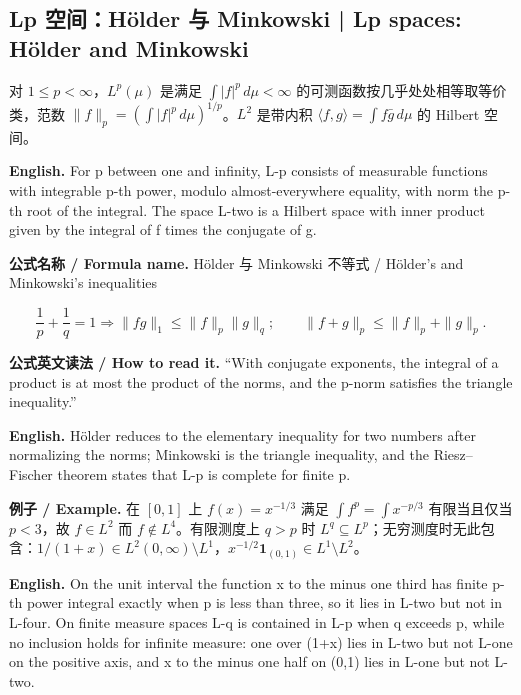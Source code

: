 \documentclass[UTF8,11pt,a4paper]{ctexart}
\newcommand{\EN}[1]{\par\noindent\textbf{English.} #1\par}
\newcommand{\READ}[1]{\par\noindent\textbf{公式英文读法 / How to read it.} #1\par}
\let\APSsubsection\subsection
\renewcommand{\subsection}[1]{\Needspace{6\baselineskip}\APSsubsection{#1}}
\newcommand{\FORMULA}[2]{\par\Needspace{3\baselineskip}\noindent\textbf{公式名称 / Formula name.} #1 / #2\par}
\newcommand{\EX}[2]{\par\noindent\textbf{例子 / Example.} #1\par\EN{#2}}
\begin{document}
\subsection{Lp 空间：Hölder 与 Minkowski | Lp spaces: Hölder and Minkowski}
\noindent 对 $1\le p<\infty$，$L^p(\mu)$ 是满足 $\int|f|^p\,d\mu<\infty$ 的可测函数按几乎处处相等取等价类，范数 $\|f\|_p=(\int|f|^p\,d\mu)^{1/p}$。$L^2$ 是带内积 $\langle f,g\rangle=\int f\bar g\,d\mu$ 的 Hilbert 空间。
\EN{For p between one and infinity, L-p consists of measurable functions with integrable p-th power, modulo almost-everywhere equality, with norm the p-th root of the integral. The space L-two is a Hilbert space with inner product given by the integral of f times the conjugate of g.}
\FORMULA{Hölder 与 Minkowski 不等式}{Hölder's and Minkowski's inequalities}
\[
\frac1p+\frac1q=1\Rightarrow\|fg\|_1\le\|f\|_p\|g\|_q;
\qquad
\|f+g\|_p\le\|f\|_p+\|g\|_p.
\]
\READ{“With conjugate exponents, the integral of a product is at most the product of the norms, and the p-norm satisfies the triangle inequality.”}
\EN{Hölder reduces to the elementary inequality for two numbers after normalizing the norms; Minkowski is the triangle inequality, and the Riesz--Fischer theorem states that L-p is complete for finite p.}
\EX{在 $[0,1]$ 上 $f(x)=x^{-1/3}$ 满足 $\int f^p=\int x^{-p/3}$ 有限当且仅当 $p<3$，故 $f\in L^2$ 而 $f\notin L^4$。有限测度上 $q>p$ 时 $L^q\subseteq L^p$；无穷测度时无此包含：$1/(1+x)\in L^2(0,\infty)\setminus L^1$，$x^{-1/2}\mathbf1_{(0,1)}\in L^1\setminus L^2$。}{On the unit interval the function x to the minus one third has finite p-th power integral exactly when p is less than three, so it lies in L-two but not in L-four. On finite measure spaces L-q is contained in L-p when q exceeds p, while no inclusion holds for infinite measure: one over (1+x) lies in L-two but not L-one on the positive axis, and x to the minus one half on (0,1) lies in L-one but not L-two.}
\end{document}
